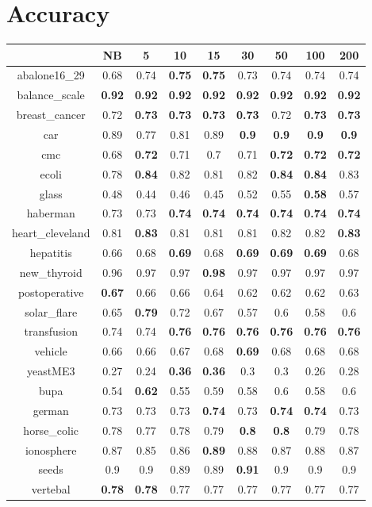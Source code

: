 \documentclass{article}%
\begin{document}
%
\normalsize%
\section*{Accuracy}%
\begin{tabular}{c|cccccccc}%
\hline%
&NB&5&10&15&30&50&100&200\\%
\hline%
abalone16\_29&0.68&0.74&\textbf{0.75}&\textbf{0.75}&0.73&0.74&0.74&0.74\\%
\hline%
balance\_scale&\textbf{0.92}&\textbf{0.92}&\textbf{0.92}&\textbf{0.92}&\textbf{0.92}&\textbf{0.92}&\textbf{0.92}&\textbf{0.92}\\%
\hline%
breast\_cancer&0.72&\textbf{0.73}&\textbf{0.73}&\textbf{0.73}&\textbf{0.73}&0.72&\textbf{0.73}&\textbf{0.73}\\%
\hline%
car&0.89&0.77&0.81&0.89&\textbf{0.9}&\textbf{0.9}&\textbf{0.9}&\textbf{0.9}\\%
\hline%
cmc&0.68&\textbf{0.72}&0.71&0.7&0.71&\textbf{0.72}&\textbf{0.72}&\textbf{0.72}\\%
\hline%
ecoli&0.78&\textbf{0.84}&0.82&0.81&0.82&\textbf{0.84}&\textbf{0.84}&0.83\\%
\hline%
glass&0.48&0.44&0.46&0.45&0.52&0.55&\textbf{0.58}&0.57\\%
\hline%
haberman&0.73&0.73&\textbf{0.74}&\textbf{0.74}&\textbf{0.74}&\textbf{0.74}&\textbf{0.74}&\textbf{0.74}\\%
\hline%
heart\_cleveland&0.81&\textbf{0.83}&0.81&0.81&0.81&0.82&0.82&\textbf{0.83}\\%
\hline%
hepatitis&0.66&0.68&\textbf{0.69}&0.68&\textbf{0.69}&\textbf{0.69}&\textbf{0.69}&0.68\\%
\hline%
new\_thyroid&0.96&0.97&0.97&\textbf{0.98}&0.97&0.97&0.97&0.97\\%
\hline%
postoperative&\textbf{0.67}&0.66&0.66&0.64&0.62&0.62&0.62&0.63\\%
\hline%
solar\_flare&0.65&\textbf{0.79}&0.72&0.67&0.57&0.6&0.58&0.6\\%
\hline%
transfusion&0.74&0.74&\textbf{0.76}&\textbf{0.76}&\textbf{0.76}&\textbf{0.76}&\textbf{0.76}&\textbf{0.76}\\%
\hline%
vehicle&0.66&0.66&0.67&0.68&\textbf{0.69}&0.68&0.68&0.68\\%
\hline%
yeastME3&0.27&0.24&\textbf{0.36}&\textbf{0.36}&0.3&0.3&0.26&0.28\\%
\hline%
bupa&0.54&\textbf{0.62}&0.55&0.59&0.58&0.6&0.58&0.6\\%
\hline%
german&0.73&0.73&0.73&\textbf{0.74}&0.73&\textbf{0.74}&\textbf{0.74}&0.73\\%
\hline%
horse\_colic&0.78&0.77&0.78&0.79&\textbf{0.8}&\textbf{0.8}&0.79&0.78\\%
\hline%
ionosphere&0.87&0.85&0.86&\textbf{0.89}&0.88&0.87&0.88&0.87\\%
\hline%
seeds&0.9&0.9&0.89&0.89&\textbf{0.91}&0.9&0.9&0.9\\%
\hline%
vertebal&\textbf{0.78}&\textbf{0.78}&0.77&0.77&0.77&0.77&0.77&0.77\\%
\hline%
\end{tabular}
\end{document}
